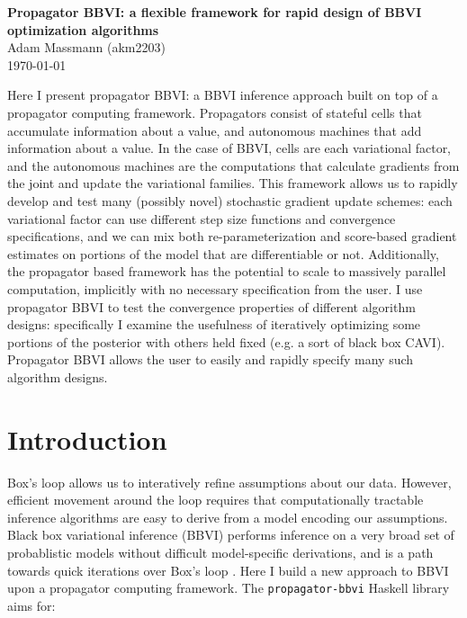 \documentclass[12pt]{article}
\begin{document}
\begin{flushleft}
\textbf{Propagator BBVI: a flexible framework for rapid design of BBVI
  optimization algorithms} \\
Adam Massmann (akm2203) \\
\today
\end{flushleft}

Here I present propagator BBVI: a BBVI inference approach built on top
of a propagator computing framework. Propagators consist of stateful
cells that accumulate information about a value, and autonomous
machines that add information about a value. In the case of BBVI,
cells are each variational factor, and the autonomous machines are the
computations that calculate gradients from the joint and update the
variational families. This framework allows us to rapidly develop and
test many (possibly novel) stochastic gradient update schemes: each
variational factor can use different step size functions and
convergence specifications, and we can mix both re-parameterization
and score-based gradient estimates on portions of the model that are
differentiable or not. Additionally, the propagator based framework
has the potential to scale to massively parallel computation,
implicitly with no necessary specification from the user. I use
propagator BBVI to test the convergence properties of different
algorithm designs: specifically I examine the usefulness of
iteratively optimizing some portions of the posterior with others held
fixed (e.g. a sort of black box CAVI). Propagator BBVI allows the user
to easily and rapidly specify many such algorithm designs.


\section{Introduction}

Box's loop allows us to interatively refine assumptions about our
data. However, efficient movement around the loop requires that
computationally tractable inference algorithms are easy to derive from
a model encoding our assumptions. Black box variational inference
(BBVI) performs inference on a very broad set of probablistic models
without difficult model-specific derivations, and is a path towards
quick iterations over Box's loop \citep[e.g.,][]{ranganath-2014,
  kuc-2017}. Here I build a new approach to BBVI upon a propagator
computing framework. The \texttt{propagator-bbvi} Haskell library aims for:
\end{document}
